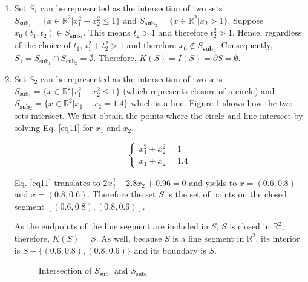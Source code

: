 \begin{enumerate}[label=(\alph*)]
\item Set $S_1$ can be represented as the intersection of two sets $S_{\text{sub}_1} = \{x \in \mathbb{R}^2 | x_1^2 + x_2^2 \leqslant 1 \}$ and $S_{\textbf{sub}_2} = \{x \in \mathbb{R}^2 | x_2 > 1 \}$. Suppose $x_0(t_1, t_2) \in S_{\textbf{sub}_2}$. This means $t_2 > 1$ and therefore $t_2^2 > 1$. Hence, regardless of the choice of $t_1$, $t_1^2 + t_2^2 > 1$ and therefore $x_0 \notin S_{\textbf{sub}_1}$. Consequently, $S_1 = S_{\text{sub}_1} \cap S_{\text{sub}_2} = \emptyset$. Therefore, $K(S) = I(S) = \partial S = \emptyset$.

\item Set $S_2$ can be represented as the intersection of two sets $S_{\text{sub}_1} = \{x \in \mathbb{R}^2 | x_1^2 + x_2^2 \leqslant 1 \}$ (which represents closure of a circle) and $S_{\textbf{sub}_2} = \{x \in \mathbb{R}^2 | x_1 + x_2 = 1.4\}$ which is a line. Figure \ref{fig11} shows how the two sets intersect. We first obtain the points where the circle and line intersect by solving Eq. \ref{eq11} for $x_1$ and $x_2$.

\begin{equation}
\left\{ \begin{array}{ll} x_1^2 + x_2^2 = 1 \\ x_1 + x_2 = 1.4 \end{array} \right.
\label{eq11}
\end{equation}

Eq. \ref{eq11} translates to $2x_2^2 - 2.8x_2 + 0.96 = 0$ and yields to $x = (0.6, 0.8)$ and $x = (0.8, 0.6)$. Therefore the set $S$ is the set of points on the closed segment $[(0.6,0.8),(0.8,0.6)]$.

As the endpoints of the line segment are included in $S$, $S$ is closed in $\mathbb{R}^2$, therefore, $K(S) = S$. As well, because $S$ is a line segment in $\mathbb{R}^2$, its interior is $S - \{(0.6,0.8),(0.8,0.6)\}$ and its boundary is $S$.

\begin{figure}[H]\centering
{}
\caption{Intersection of $S_{\text{sub}_1}$ and $S_{\text{sub}_2}$}\label{fig11}
\end{figure}


\end{enumerate}
